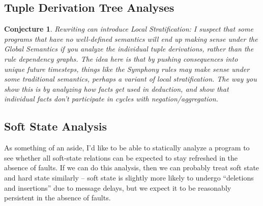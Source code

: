 \documentclass{article}
\newtheorem{conjecture}{Conjecture}
\begin{document}
\subsection{Tuple Derivation Tree Analyses}
\begin{conjecture} {\em Rewriting can introduce Local Stratification:} 
  I suspect that {\em some} programs that have no well-defined
  semantics will end up making sense under the Global Semantics if you
  analyze the individual tuple derivations, rather than the rule
  dependency graphs.  The idea here is that by pushing consequences
  into unique future timesteps, things like the Symphony rules may
  make sense under some traditional semantics, perhaps a variant of
  local stratification.  The way you show this is by analyzing how
  facts get used in deduction, and show that individual facts don't
  participate in cycles with negation/aggregation.
\end{conjecture}

\subsection{Soft State Analysis}
As something of an aside, I'd like to be able to statically analyze a
program to see whether all soft-state relations can be expected to
stay refreshed in the absence of faults.  If we can do this analysis,
then we can probably treat soft state and hard state similarly -- soft
state is slightly more likely to undergo ``deletions and insertions''
due to message delays, but we expect it to be reasonably persistent in
the absence of faults.


\end{document}
